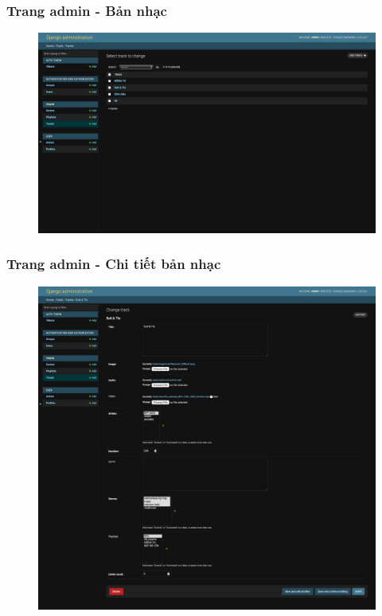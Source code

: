 \documentclass[a4paper]{article}
\begin{document}
\subsubsection{Trang admin - Bản nhạc}
\begin{figure}[h!]
\begin{center}
\includegraphics[width=12cm]{admin_track.png}
\end{center}
\end{figure}

\subsubsection{Trang admin - Chi tiết bản nhạc}
\begin{figure}[h!]
\begin{center}
\includegraphics[width=12cm]{admin_track_detail.png}
\end{center}
\end{figure}
\newpage
\end{document}
